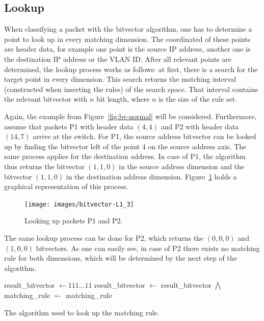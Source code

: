 \documentclass[a4paper,
		12pt,
		parskip=full,
		titlepage
		]{scrartcl}
\begin{document}
\subsection{Lookup}
When classifying a packet with the bitvector algorithm, one has to determine a point to look up in every matching dimension.
The coordinated of these points are header data, for example one point is 
the source IP address, another one is the destination IP address or the VLAN ID.
After all relevant points are determined, the lookup process works as follows:
at first, there is a search for the target point in every dimension.
This search returns the matching interval (constructed when inserting the rules) of the search space.
That interval contains the relevant bitvector with $n$ bit length, where $n$ is the size of the rule set.

Again, the example from Figure~\ref{fig:bv-normal} will be considered.
Furthermore, assume that packets P1 with header data $(4, 4)$ and P2 with header data $(14, 7)$ arrive at the switch.
For P1, the source address bitvector can be looked up by finding the bitvector left of the point $4$ on the source address axis.
The same process applies for the destination address.
In case of P1, the algorithm thus returns the bitvector $(1, 1, 0)$ in the 
source address dimension and the bitvector $(1, 1, 0)$ in the destination address dimension.
Figure~\ref{fig:bv-lookup} holds a graphical representation of this process.

\begin{figure}
\centering
\texttt{[image: images/bitvector-L1\_3]}
\caption{Looking up packets P1 and P2.}
\label{fig:bv-lookup}
\end{figure}

The same lookup process can be done for P2, which returns the $(0, 0, 0)$ and $(1, 0, 0)$ bitvectors.
As one can easily see, in case of P2 there exists no matching rule for both dimensions,
which will be determined by the next step of the algorithm.

\begin{algorithm}
\begin{algorithmic}[1]
    \State result\_bitvector $\gets 111\ldots 11$
        \State result\_bitvector $\gets$ result\_bitvector $\bigwedge$ 
    \EndFor
    \State matching\_rule $\gets$ 
    \State \Return matching\_rule
\EndFunction
\end{algorithmic}
\caption{The algorithm used to look up the matching rule.}
\label{alg:bv-join}
\end{algorithm}
\end{document}
